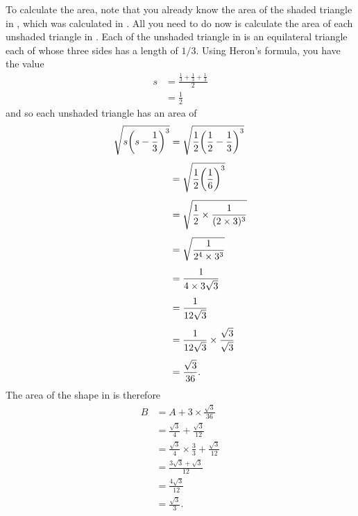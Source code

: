 \documentclass[a4paper,oneside,12pt]{article}
\begin{document}
\begin{problem}
{\begin{solution}
To calculate the area, note that you already know the area of the
shaded triangle in
, which was
calculated in .  All you
need to do now is calculate the area of each unshaded triangle in
.  Each of the
unshaded triangle in
 is an
equilateral triangle each of whose three sides has a length of $1/3$.
Using Heron's formula, you have the value
\begin{align*}
s
&=
\frac{
  \frac{1}{3} + \frac{1}{3} + \frac{1}{3}
}{
  2
} \\[4pt]
&=
\frac{1}{2}
\end{align*}
and so each unshaded triangle has an area of
\begin{align*}
\sqrt{
  s \parenthesis*{s - \frac{1}{3}}^3
}
&=
\sqrt{
  \frac{1}{2} \parenthesis*{\frac{1}{2} - \frac{1}{3}}^3
} \\[4pt]
&=
\sqrt{
  \frac{1}{2} \parenthesis*{\frac{1}{6}}^3
} \\[4pt]
&=
\sqrt{
  \frac{1}{2} \times \frac{1}{(2 \times 3)^3}
} \\[4pt]
&=
\sqrt{
  \frac{1}{2^4 \times 3^3}
} \\[4pt]
&=
\frac{
  1
}{
  4 \times 3 \sqrt{3}
} \\[4pt]
&=
\frac{
  1
}{
  12 \sqrt{3}
} \\[4pt]
&=
\frac{
  1
}{
  12 \sqrt{3}
}
\times
\frac{\sqrt{3}}{\sqrt{3}} \\[4pt]
&=
\frac{
  \sqrt{3}
}{
  36
}.
\end{align*}
The area of the shape in 
is therefore
\begin{align*}
B
&=
A + 3 \times \frac{\sqrt{3}}{36} \\[4pt]
&=
\frac{\sqrt{3}}{4} + \frac{\sqrt{3}}{12} \\[4pt]
&=
\frac{\sqrt{3}}{4} \times \frac{3}{3} + \frac{\sqrt{3}}{12} \\[4pt]
&=
\frac{3\sqrt{3} + \sqrt{3}}{12} \\[4pt]
&=
\frac{4\sqrt{3}}{12} \\[4pt]
&=
\frac{\sqrt{3}}{3}.
\end{align*}


\end{solution}}
\end{problem}
\end{document}
